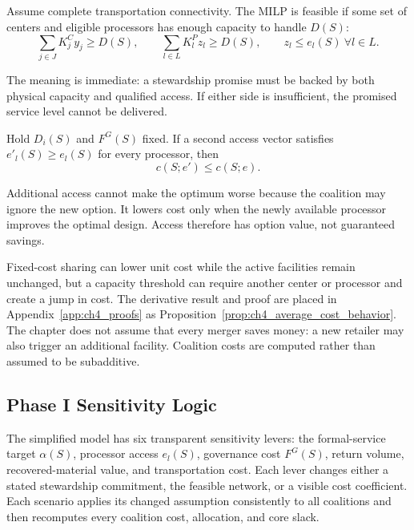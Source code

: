 \begin{proposition}
\label{prop:ch4_feasibility}
Assume complete transportation connectivity. The MILP is feasible if some set of centers and eligible processors has enough capacity to handle $D(S)$:
\begin{equation}
\label{eq:ch4_feasibility_condition}
\sum_{j\in J}K_j^C y_j\geq D(S),
\qquad
\sum_{l\in L}K_l^P z_l\geq D(S),
\qquad
z_l\leq e_l(S)\ \forall l\in L.
\end{equation}
\end{proposition}

The meaning is immediate: a stewardship promise must be backed by both physical capacity and qualified access. If either side is insufficient, the promised service level cannot be delivered.

\begin{proposition}
\label{prop:ch4_access_value}
Hold $D_i(S)$ and $F^G(S)$ fixed. If a second access vector satisfies $e'_l(S)\geq e_l(S)$ for every processor, then
\begin{equation}
\label{eq:ch4_access_value}
c(S;e')\leq c(S;e).
\end{equation}
\end{proposition}

Additional access cannot make the optimum worse because the coalition may ignore the new option. It lowers cost only when the newly available processor improves the optimal design. Access therefore has option value, not guaranteed savings.

Fixed-cost sharing can lower unit cost while the active facilities remain unchanged, but a capacity threshold can require another center or processor and create a jump in cost. The derivative result and proof are placed in Appendix~\ref{app:ch4_proofs} as Proposition~\ref{prop:ch4_average_cost_behavior}. The chapter does not assume that every merger saves money: a new retailer may also trigger an additional facility. Coalition costs are computed rather than assumed to be subadditive.

\subsection{Phase I Sensitivity Logic}

The simplified model has six transparent sensitivity levers: the formal-service target $\alpha(S)$, processor access $e_l(S)$, governance cost $F^G(S)$, return volume, recovered-material value, and transportation cost. Each lever changes either a stated stewardship commitment, the feasible network, or a visible cost coefficient. Each scenario applies its changed assumption consistently to all coalitions and then recomputes every coalition cost, allocation, and core slack.

